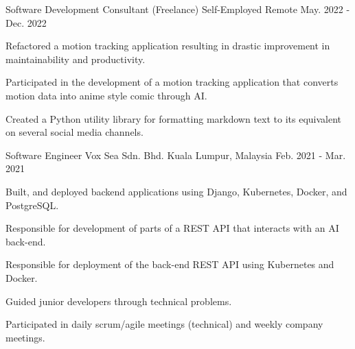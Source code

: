 

\begin{cventries}

\cventry
  {Software Development Consultant (Freelance)} %
  {Self-Employed} %
  {Remote} %
  {May. 2022 - Dec. 2022} %
  {
    \begin{cvitems} %
      \item {Refactored a motion tracking application resulting in drastic improvement in maintainability and productivity.}
      \item {Participated in the development of a motion tracking application that converts motion data into anime style comic through AI.}
      \item {Created a Python utility library for formatting markdown text to its equivalent on several social media channels.}
    \end{cvitems}
  }

  \cventry
    {Software Engineer} %
    {Vox Sea Sdn. Bhd.} %
    {Kuala Lumpur, Malaysia} %
    {Feb. 2021 - Mar. 2021} %
    {
      \begin{cvitems} %
        \item {Built, and deployed backend applications using Django, Kubernetes, Docker, and PostgreSQL.}
        \item {Responsible for development of parts of a REST API that interacts with an AI back-end.}
        \item {Responsible for deployment of the back-end REST API using Kubernetes and Docker.}
        \item {Guided junior developers through technical problems.}
        \item {Participated in daily scrum/agile meetings (technical) and weekly company meetings.}
      \end{cvitems}
    }


\end{cventries}
